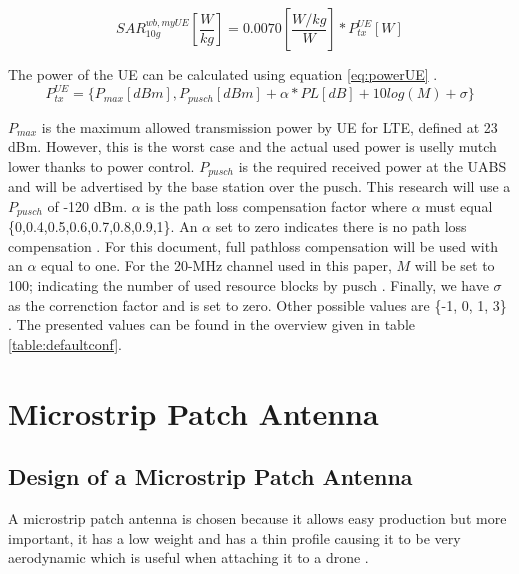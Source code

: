 \begin{equation} 
SAR^{wb,myUE}_{10g} \left[\frac{W}{kg}\right] = 0.0070 \left[\frac{W/kg}{W}\right] * P_{tx}^{UE} [W]
\label{eq:ulToSar}
\end{equation}

The power of the \gls{UE} can be calculated using equation \ref{eq:powerUE} \cite{J22_plets2015joint}.
\begin{equation} 
P_{tx}^{UE} = \big\{P_{max} [dBm] , P_{pusch} [dBm] + \alpha * PL [dB] + 10log(M) + \sigma \big\}
\label{eq:powerUE}
\end{equation}

$P_{max}$ is the maximum allowed transmission power by \gls{UE} for LTE, defined at 23 dBm. 
However, this is the worst case and the actual used power is uselly mutch lower thanks to power control.
$P_{pusch}$ is the required received power at the
\gls{UABS} and will be advertised by the base station over the \gls{pusch}. This research will use a
$P_{pusch}$ of -120 dBm. 
$\alpha$ is the path loss compensation factor where 
$\alpha$ must equal \{0,0.4,0.5,0.6,0.7,0.8,0.9,1\}. An $\alpha$ set to 
zero indicates there is no path loss compensation \cite{J32,J33}.
For this document, full pathloss compensation will be used with an $\alpha$ equal to one.
For the 20-MHz
channel used in this paper, $M$ will be set to 100; indicating the number of  used resource blocks by \gls{pusch} \cite{J22_plets2015joint}.
Finally, we have $\sigma$
 as the correnction factor and is set to zero. Other possible values are \{-1, 0, 1, 3\} \cite{J22_plets2015joint,J32}.
 The presented values can be found in the overview given in table \ref{table:defaultconf}.

\section{Microstrip Patch Antenna}
\subsection{Design of  a Microstrip Patch Antenna}
\label{sub:definingAntenna}
A microstrip patch antenna is chosen because it allows easy production but more important, it has a low weight 
and has a thin profile causing it to be very aerodynamic which is useful when attaching it to a drone \cite{J13_microstripadvantages}.

